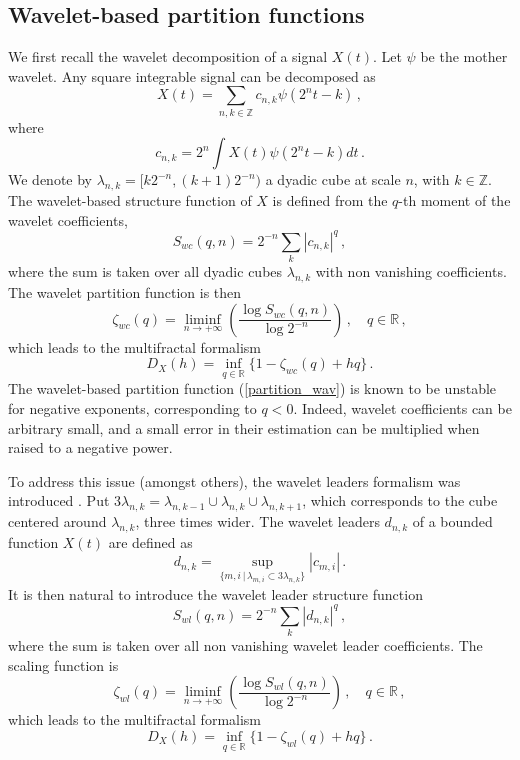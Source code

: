 \documentclass[a4paper]{article}
\newcommand{\R}{\mathbb{R}}
\newcommand{\Z}{\mathbb{Z}}
\begin{document}
\subsection{Wavelet-based partition functions}
\label{ssec:wavform}

We first recall the wavelet decomposition of a signal $X(t)$.
Let $\psi$ be the mother wavelet.
Any square integrable signal can be decomposed as
\[
X(t)=\sum_{n,k\in\Z} c_{n,k}\psi(2^nt-k)\,,
\] 
where $$c_{n,k}=2^n\int X(t)\psi(2^nt-k)dt\,.$$ 
We denote by $\lambda_{n,k}=[k2^{-n}, (k+1)2^{-n})$ a dyadic cube at scale $n$, with $k\in\Z$.
The wavelet-based structure function of $X$ is defined from the $q$-th moment of the wavelet coefficients,
$$S_{wc}(q,n) = 2^{-n} \sum_k \left| c_{n,k}  \right|^q\,,$$
where the sum is taken over all dyadic cubes $\lambda_{n,k}$ with non vanishing coefficients.
The wavelet partition function is then
\vspace{-.2cm}
\begin{equation}\label{partition_wav}
\zeta_{wc}(q) = \liminf_{n\to+\infty} \left( \dfrac{\log S_{wc}(q,n)}{\log 2^{-n}} \right)\,, \quad q\in\R \,,
\end{equation}
which leads to the multifractal formalism \cite{ParisiF85}
\begin{equation}\label{spectrum_wav}
D_X(h) = \inf\limits_{q\in\R} \{ 1- \zeta_{wc}(q) + hq \}\,.
\end{equation}
The wavelet-based partition function (\ref{partition_wav}) is known to be unstable for negative exponents, corresponding to $q<0$. 
Indeed, wavelet coefficients can be arbitrary small, and a small error in their estimation can be multiplied when raised to a negative power.

To address this issue (amongst others), the wavelet leaders formalism was introduced \cite{JaffLA06}.
Put $3\lambda_{n,k}= \lambda_{n,k-1}\cup \lambda_{n,k}\cup \lambda_{n,k+1}$, which corresponds to the cube centered around $\lambda_{n,k}$, three times wider. 
The wavelet leaders $d_{n,k}$ of a bounded function $X(t)$ are defined as
\vspace{-.2cm}
\[
d_{n,k} = \sup\limits_{\{m,i\,|\, \lambda_{m,i} \subset 3\lambda_{n,k}\}}|c_{m,i}|\,.
\]
It is then natural to introduce the wavelet leader structure function $$S_{wl}(q,n) = 2^{-n} \sum_k \left| d_{n,k}  \right|^q\,,$$ where the sum is taken over all non vanishing wavelet leader coefficients.
The scaling function is
\vspace{-.2cm}
\begin{equation}\label{partition_wl}
\zeta_{wl}(q) = \liminf_{n\to+\infty} \left( \dfrac{\log S_{wl}(q,n)}{\log 2^{-n}} \right)\,, \quad q\in\R \,,
\end{equation}
which leads to the multifractal formalism
\begin{equation}\label{spectrum_wl}
D_X(h) = \inf\limits_{q\in\R} \{ 1- \zeta_{wl}(q) + hq \}\,.
\end{equation}
\end{document}
